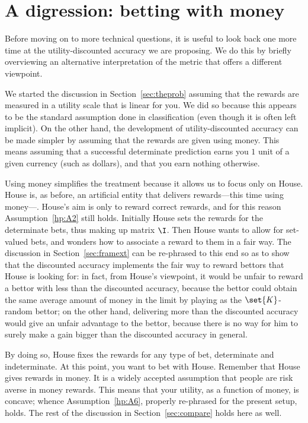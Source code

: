 \documentclass[a4paper,10pt,reqno]{amsart}
\theoremstyle{remark}
\begin{document}
\section{A digression: betting with money}\label{sec:money}
Before moving on to more technical questions, it is useful to look back one more time at the utility-discounted accuracy we are proposing. We do this by briefly overviewing an alternative interpretation of the metric that offers a different viewpoint.

We started the discussion in Section~\ref{sec:theprob} assuming that the rewards are measured in a utility scale that is linear for you. We did so because this appears to be the standard assumption done in classification (even though it is often left implicit). On the other hand, the development of utility-discounted accuracy can be made simpler by assuming that the rewards are given using money. This means assuming that a successful determinate prediction earns you $1$ unit of a given currency (such as dollars), and that you earn nothing otherwise.

Using money simplifies the treatment because it allows us to focus only on House. House is, as before, an artificial entity that delivers rewards---this time using money---. House's aim is only to reward correct rewards, and for this reason Assumption~\ref{hp:A2} still holds. Initially House sets the rewards for the determinate bets, thus making up matrix $\I$. Then House wants to allow for set-valued bets, and wonders how to associate a reward to them in a fair way. The discussion in Section~\ref{sec:framext} can be re-phrased to this end so as to show that the discounted accuracy implements the fair way to reward bettors that House is looking for: in fact, from House's viewpoint, it would be unfair to reward a bettor with less than the discounted accuracy, because the bettor could obtain the same average amount of money in the limit by playing as the $\set{K}$-random bettor; on the other hand, delivering more than the discounted accuracy would give an unfair advantage to the bettor, because there is no way for him to surely make a gain bigger than the discounted accuracy in general.

By doing so, House fixes the rewards for any type of bet, determinate and indeterminate. At this point, you want to bet with House. Remember that House gives rewards in money. It is a widely accepted assumption that people are risk averse in money rewards. This means that your utility, as a function of money, is concave; whence Assumption~\ref{hp:A6}, properly re-phrased for the present setup, holds. The rest of the discussion in Section~\ref{sec:compare} holds here as well.
\end{document}
